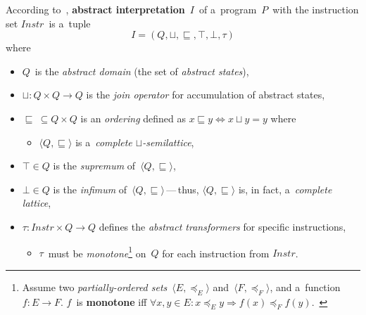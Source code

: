 \begin{definition}
    \label{def:AI}
    According to~\cite{AILatticeModelCousot, savAI}, \textbf{abstract interpretation}~$ I $~of a~program~$ P $~with the instruction set $ Instr $~is a~tuple
    $$ 
        I = (Q, \sqcup, \sqsubseteq, \top, \bot, \tau)
    $$
    where
    \begin{itemize}
        \item $ Q $~is the \emph{abstract domain} (the set of \emph{abstract states}),
    
        \item $ \sqcup : Q \times Q \rightarrow Q $ is the \emph{join operator} for accumulation of abstract states,
    
        \item $ \sqsubseteq\ \subseteq Q \times Q $ is an \emph{ordering} defined as $ x \sqsubseteq y \Longleftrightarrow x \sqcup y = y $ where
            \begin{itemize}
                \item $ \langle Q, \sqsubseteq \rangle $ is a~\emph{complete $ \sqcup $-semilattice},
            \end{itemize}
    
        \item $ \top \in Q $ is the \emph{supremum} of~$ \langle Q, \sqsubseteq \rangle $,
    
        \item $ \bot \in Q $ is the \emph{infimum} of~$ \langle Q, \sqsubseteq \rangle $\,---\,thus, $ \langle Q, \sqsubseteq \rangle $ is, in fact, a~\emph{complete lattice},
    
        \item $ \tau : Instr \times Q \rightarrow Q $ defines the \emph{abstract transformers} for specific instructions,
            \begin{itemize}
                \item $ \tau $~must be \emph{monotone}\footnote{Assume two \emph{partially-ordered sets}~$ \langle E, \preceq_E \rangle $ and~$ \langle F, \preceq_F \rangle $, and a~function $ f : E \rightarrow F $. $ f $~is \textbf{monotone} iff $ \forall x, y \in E : x \preceq_E y \Longrightarrow f(x) \preceq_F f(y) $.~\cite{staticAnalysisRival}} on~$ Q $ for each instruction from $ Instr $.
            \end{itemize}
    \end{itemize}
\end{definition}

